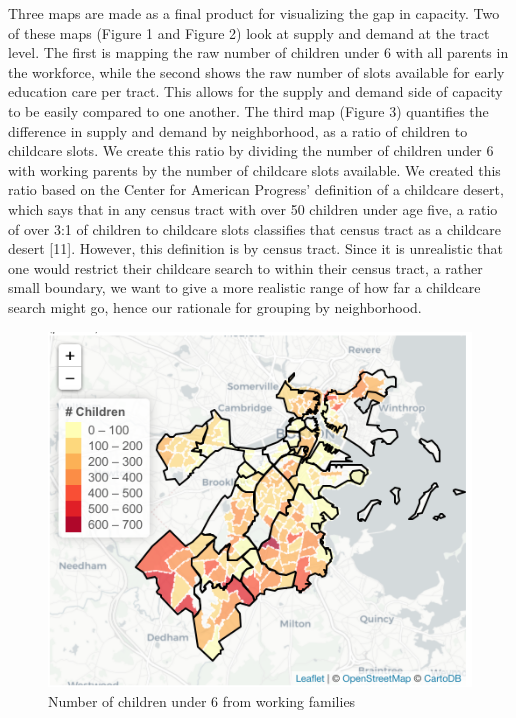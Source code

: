 \documentclass[10pt,letterpaper]{article}
\begin{document}
Three maps are made as a final product for visualizing the gap in
capacity. Two of these maps (Figure 1 and Figure 2) look at supply and
demand at the tract level. The first is mapping the raw number of
children under 6 with all parents in the workforce, while the second
shows the raw number of slots available for early education care per
tract. This allows for the supply and demand side of capacity to be
easily compared to one another. The third map (Figure 3) quantifies the
difference in supply and demand by neighborhood, as a ratio of children
to childcare slots. We create this ratio by dividing the number of
children under 6 with working parents by the number of childcare slots
available. We created this ratio based on the Center for American
Progress' definition of a childcare desert, which says that in any
census tract with over 50 children under age five, a ratio of over 3:1
of children to childcare slots classifies that census tract as a
childcare desert {[}11{]}. However, this definition is by census tract.
Since it is unrealistic that one would restrict their childcare search
to within their census tract, a rather small boundary, we want to give a
more realistic range of how far a childcare search might go, hence our
rationale for grouping by neighborhood.

\begin{figure}

{\centering \includegraphics[width=0.8\linewidth]{fig1_capacitytractdemand} 

}

\caption{Number of children under 6 from working families}\label{fig:unnamed-chunk-2}
\end{figure}
\end{document}
